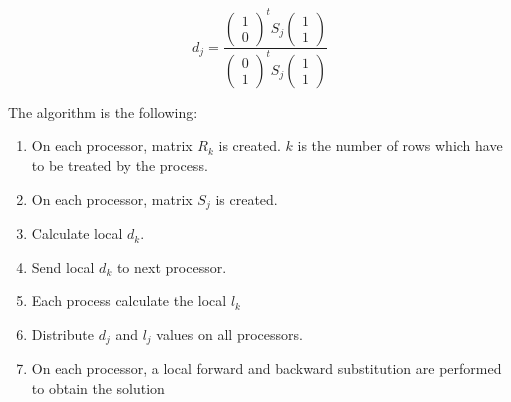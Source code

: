 \documentclass{article}
\begin{document}
                    \begin{equation}
                        d_{j}=\frac
                        {
                            \begin{pmatrix}
                                1\\
                                0
                            \end{pmatrix}^{t}
                            S_{j}
                            \begin{pmatrix}
                                1\\
                                1
                            \end{pmatrix}
                        }
                        {
                            \begin{pmatrix}
                                0\\
                                1
                            \end{pmatrix}^{t}
                            S_{j}
                            \begin{pmatrix}
                                1\\
                                1
                            \end{pmatrix}
                        }
                    \end{equation} 

                    The algorithm is the following:
                    \begin{enumerate}
                        \item On each processor, matrix $R_{k}$ is created. $k$ is the number of rows
                        which have to be treated by the process.
                        \item On each processor, matrix $S_{j}$ is created.
                        \item Calculate local $d_{k}$.
                        \item Send local $d_{k}$ to next processor.
                        \item Each process calculate the local $l_{k}$
                        \item Distribute $d_{j}$ and $l_{j}$ values on all processors.
                        \item On each processor, a local forward and backward substitution are performed
                        to obtain the solution
                    \end{enumerate}
\end{document}
